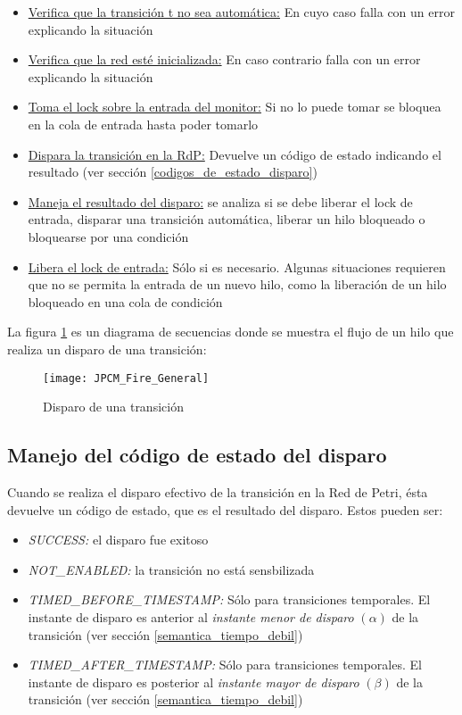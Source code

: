 \begin{itemize}
  \item \underline{Verifica que la transición t no sea automática:} En cuyo caso
  falla con un error explicando la situación
  \item \underline{Verifica que la red esté inicializada:} En caso contrario
  falla con un error explicando la situación
  \item \underline{Toma el lock sobre la entrada del monitor:} Si no lo puede
  tomar se bloquea en la cola de entrada hasta poder tomarlo
  \item  \underline{Dispara la transición en la RdP:} Devuelve un código de
  estado indicando el resultado (ver sección \ref{codigos_de_estado_disparo})
  \item \underline{Maneja el resultado del disparo:} se analiza si se debe
  liberar el lock de entrada, disparar una transición automática, liberar un
  hilo bloqueado o bloquearse por una condición
  \item \underline{Libera el lock de entrada:} Sólo si es necesario. Algunas
  situaciones requieren que no se permita la entrada de un nuevo hilo, como la
  liberación de un hilo bloqueado en una cola de condición
\end{itemize}
 
La figura \ref{fig:JPCM_Fire_General} es un diagrama de secuencias donde se
muestra el flujo de un hilo que realiza un disparo de una transición:

\begin{figure}[H]
  \hspace*{-3cm}
  \texttt{[image: JPCM\_Fire\_General]}
  \caption{Disparo de una transición}
  \label{fig:JPCM_Fire_General}
\end{figure}

\subsection*{Manejo del código de estado del disparo}
\label{codigos_de_estado_disparo}

Cuando se realiza el disparo efectivo de la transición en la Red de Petri, ésta
devuelve un código de estado, que es el resultado del disparo. Estos pueden
ser:
\begin{itemize}
  \item \textit{SUCCESS:} el disparo fue exitoso
  \item \textit{NOT\_ENABLED:} la transición no está sensbilizada
  \item \textit{TIMED\_BEFORE\_TIMESTAMP:} Sólo para transiciones
  temporales. El instante de disparo es anterior al \textit{instante menor de
  disparo} $(\alpha)$ de la transición (ver sección \ref{semantica_tiempo_debil})
  \item \textit{TIMED\_AFTER\_TIMESTAMP:} Sólo para transiciones
  temporales. El instante de disparo es posterior al \textit{instante mayor de
  disparo} $(\beta)$ de la transición (ver sección \ref{semantica_tiempo_debil})
\end{itemize}

